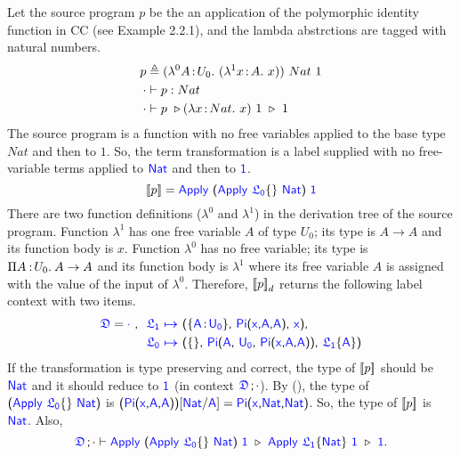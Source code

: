 \begin{exmp}
\label{ex:defun example} 
Let the source program $p$ be the an application of the polymorphic identity function in CC (see Example 2.2.1), and the lambda abstrctions are tagged with natural numbers.
\begin{align*}
	p &\triangleq (\lami{0}{A}{U_0}{(\lami{1}{x}{A}{x})})\ Nat\ 1\\
	\cdot &\vdash p \mathrel{:} Nat\\
	\cdot &\vdash p\ \triangleright (\lam{x}{Nat}{x})\ 1\ \triangleright\ 1
\end{align*}
The source program is a function with no free variables applied to the base type $Nat$ and then to $1$. So, the term transformation is a label supplied with no free-variable terms applied to $\target{Nat}$ and then to $\target{1}$.
\begin{equation*}
	\bbracket{p} = 
	\target{Apply}\ \sfpl \target{Apply}\ \targetlab{\flabel_0}{}\ \target{Nat} \sfpr \ \target{1}
\end{equation*}
There are two function definitions ($\lambda^0$ and $\lambda^1$) in the derivation tree of the source program. 
Function $\lambda^1$ has one free variable $A$ of type $U_0$; its type is $A \rightarrow A$ and its function body is $x$. 
Function $\lambda^0$ has no free variable; its type is $\Pi A\mkern1.5mu{\hspace{0.5mm}{:}\hspace{0.5mm}} U_0.\hspace{0.8mm}A \rightarrow A$ and its function body is $\lambda^1$ where its free variable $A$ is assigned with the value of the input of $\lambda^0$. Therefore, ${[\![ p ]\!]}_d$ returns the following label context with two items.
\begin{align*}
	\target{\fdef} = \target{\cdot}\ \sfcomma\ &\itemdef{\target{\flabel_1}}{\itemtype{A}{U_0}}{\targetpi{x}{A}{A}}{\target{x}}\sfcomma\\
	& \itemdef{\target{\flabel_0}}{}
	{\target{Pi}\textsf{(}\target{A}\sfcomma \target{U_0}\sfcomma \targetpi{x}{A}{A}\textsf{)}}
	{\targetlab{\flabel_1}{A}}
\end{align*}
If the transformation is type preserving and correct, the type of ${[\![ p ]\!]}$ should be $\target{Nat}$ and it should reduce to $\target{1}$ (in context $\target{\fdef} \semicolon \cdot$).
By (), the type of $\sfpl \target{Apply}\ \targetlab{\flabel_0}{}\ \target{Nat} \sfpr$ is $\sfpl \targetpi{x}{A}{A} \sfpr \targetsub{Nat}{A} = \targetpi{x}{Nat}{Nat}$. So, the type of ${[\![ p ]\!]}$ is $\target{Nat}$. Also,
\begin{equation*}
	\target{\fdef} \semicolon \cdot \vdash
	\target{Apply}\ \sfpl \target{Apply}\ \targetlab{\flabel_0}{}\ \target{Nat} \sfpr \ \target{1}\ \triangleright\ 
	\target{Apply}\ \targetlab{\flabel_1}{Nat}\ \target{1}\ \triangleright\ 
	\target{1}.
\end{equation*}
\end{exmp}



